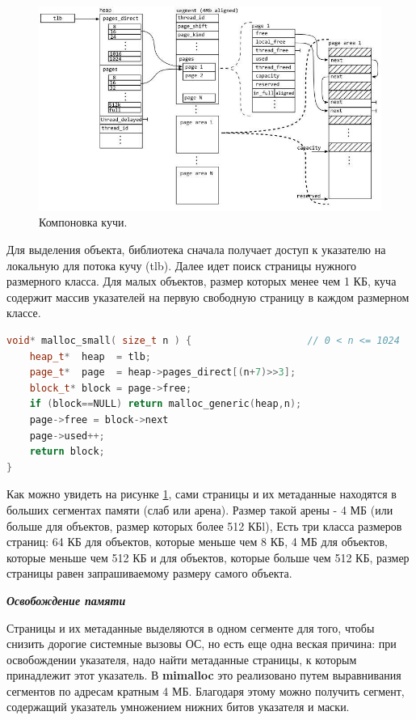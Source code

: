\begin{figure}[!h]
	\begin{center}
		\includegraphics[scale=0.8]{images/mimalloc-design-overview.jpg}
		\caption{Компоновка кучи.}
		\label{mimalloc-design-overview}
	\end{center}
\end{figure}

Для выделения объекта, библиотека сначала получает доступ к указателю на локальную для потока кучу (tlb). Далее идет поиск страницы нужного размерного класса. Для малых объектов, размер которых менее чем 1 КБ, куча содержит массив указателей на первую свободную страницу в каждом размерном классе.

\pagebreak

\begin{lstlisting}[language=c++,numbers=none]
void* malloc_small( size_t n ) {                    // 0 < n <= 1024
	heap_t*  heap  = tlb;
	page_t*  page  = heap->pages_direct[(n+7)>>3];
	block_t* block = page->free;
	if (block==NULL) return malloc_generic(heap,n);
	page->free = block->next
	page->used++;
	return block;
}
\end{lstlisting}

Как можно увидеть на рисунке \ref{mimalloc-design-overview}, сами страницы и их метаданные находятся в больших сегментах памяти (слаб или арена). Размер такой арены - 4 МБ (или больше для объектов, размер которых более 512 КБl), Есть три класса размеров страниц: 64 КБ для объектов, которые меньше чем 8 КБ, 4 МБ для объектов, которые меньше чем 512 КБ и для объектов, которые больше чем 512 КБ, размер страницы равен запрашиваемому размеру самого объекта.

\bigbreak
\textit{\textbf{Освобождение памяти}}

Страницы и их метаданные выделяются в одном сегменте для того, чтобы снизить дорогие системные вызовы ОС, но есть еще одна веская причина: при освобождении указателя, надо найти метаданные страницы, к которым принадлежит этот указатель. В \textbf{mimalloc} это реализовано путем выравнивания сегментов по адресам кратным 4 МБ. Благодаря этому можно получить сегмент, содержащий указатель умножением нижних битов указателя и маски.

